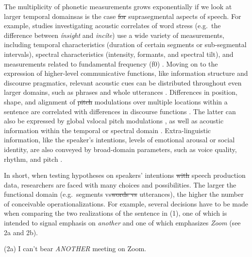 \documentclass[Review,times,sageh]{sagej}
\providecommand{\DIFaddtex}[1]{{\protect\color{blue}\uwave{#1}}} %
\providecommand{\DIFdeltex}[1]{{\protect\color{red}\sout{#1}}}                      %
\providecommand{\DIFaddbegin}{} %
\providecommand{\DIFaddend}{} %
\providecommand{\DIFdelbegin}{} %
\providecommand{\DIFdelend}{} %
\providecommand{\DIFadd}[1]{\texorpdfstring{\DIFaddtex{#1}}{#1}} %
\providecommand{\DIFdel}[1]{\texorpdfstring{\DIFdeltex{#1}}{}} %
\begin{document}
The multiplicity of phonetic measurements grows exponentially if we look at larger temporal domains\DIFaddbegin \DIFadd{, }\DIFaddend as is the case \DIFdelbegin \DIFdel{for }\DIFdelend \DIFaddbegin \DIFadd{with }\DIFaddend suprasegmental aspects of speech.
For example, studies investigating acoustic correlates of word stress (e.g.~the difference between \emph{ínsight} and \emph{incíte}) use a wide variety of measurements, including temporal characteristics (duration of certain segments or sub-segmental intervals), spectral characteristics (intensity, formants, and spectral tilt), and measurements related to fundamental frequency (f0) \citep[e.g.,][]{gordon2017acoustic}.
Moving on to the expression of higher-level communicative functions, like information structure and discourse pragmatics, relevant acoustic cues can be distributed throughout even larger domains, such as phrases and whole utterances \citep[e.g.,][]{ladd2008intonational}.
Differences in position, shape, and alignment of \DIFdelbegin \DIFdel{pitch }\DIFdelend \DIFaddbegin \DIFadd{f0 }\DIFaddend modulations over multiple locations within a sentence are correlated with differences in discourse functions \citep[e.g.,][]{niebuhr2011}.
The latter can also be expressed by global vs\DIFaddbegin \DIFadd{.~}\DIFaddend local pitch modulations \citep{heuven2002}, as well as acoustic information within the temporal or spectral domain \citep[e.g.,][]{van2005speech}.
Extra-linguistic information, like the speaker's intentions, levels of emotional arousal or social identity, are also conveyed by broad-domain parameters, such as voice quality, rhythm, and pitch \citep{foulkes2006, ogden2004, white2009}.

In short, when testing hypotheses on speakers' intentions \DIFdelbegin \DIFdel{with }\DIFdelend \DIFaddbegin \DIFadd{using }\DIFaddend speech production data, researchers are faced with many choices and possibilities.
The larger the functional domain (e.g.~segments vs\DIFdelbegin \DIFdel{words vs }\DIFdelend \DIFaddbegin \DIFadd{.~words vs.~}\DIFaddend utterances), the higher the number of conceivable operationalizations.
For example, several decisions have to be made when comparing the two realizations of the sentence in (1), one of which is intended to signal emphasis on \emph{another} and one of which emphasizes \emph{Zoom} (see 2a and 2b).

\vspace{1em}

(2a) I can't bear \emph{ANOTHER} meeting on Zoom.
\end{document}

